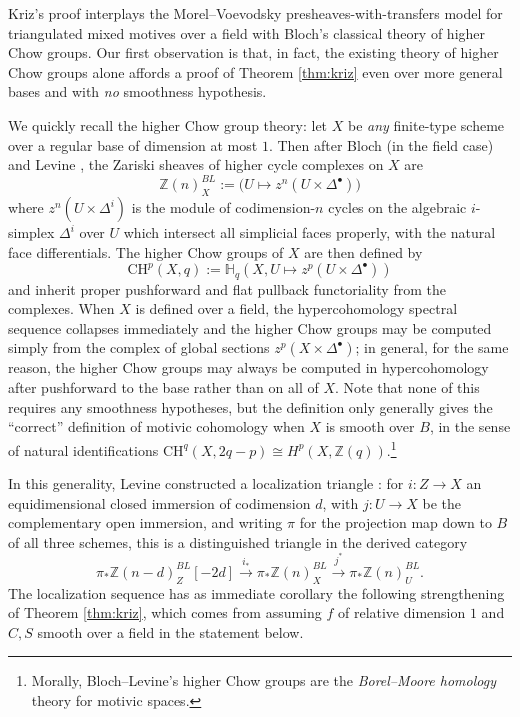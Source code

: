 \documentclass[a4paper,reqno,11pt]{amsart}
\theoremstyle{plain}
\theoremstyle{definition}
\theoremstyle{remark}
\newcommand{\CH}{{\mathrm{CH}}}
\newcommand{\Z}{\mathbb{Z}}
\begin{document}
Kriz's proof interplays the Morel--Voevodsky presheaves-with-transfers model for triangulated mixed motives over a field with Bloch's classical theory of higher Chow groups. Our first observation is that, in fact, the existing theory of higher Chow groups alone affords a proof of Theorem \ref{thm:kriz} even over more general bases and with \emph{no} smoothness hypothesis.

We quickly recall the higher Chow group theory: let $X$ be \emph{any} finite-type scheme over a regular base of dimension at most $1$. Then after Bloch \cite{B} (in the field case) and Levine \cite{L2}, the Zariski sheaves of higher cycle complexes on $X$ are
\[
    \Z(n)^{BL}_{X} := \bigl(U\mapsto z^n(U\times \Delta^\bullet)\bigr)
\]
where $z^n(U\times \Delta^i)$ is the module of codimension-$n$ cycles on the algebraic $i$-simplex $\Delta^i$ over $U$ which intersect all simplicial faces properly, with the natural face differentials. The higher Chow groups of $X$ are then defined by
\[
\CH^p(X, q) := \mathbb{H}_q(X, U\mapsto z^p(U\times \Delta^\bullet))
\]
and inherit proper pushforward and flat pullback functoriality from the complexes. When $X$ is defined over a field, the hypercohomology spectral sequence collapses immediately and the higher Chow groups may be computed simply from the complex of global sections $z^p(X\times \Delta^\bullet)$; in general, for the same reason, the higher Chow groups may always be computed in hypercohomology after pushforward to the base rather than on all of $X$. Note that none of this requires any smoothness hypotheses, but the definition only generally gives the ``correct'' definition of motivic cohomology when $X$ is smooth over $B$, in the sense of natural identifications $\CH^q(X, 2q-p)\cong H^p(X,\Z(q))$.\footnote{Morally, Bloch--Levine's higher Chow groups are the \emph{Borel--Moore homology} theory for motivic spaces.}

In this generality, Levine constructed a localization triangle \cite[Theorem 1.7]{L2}: for $i:Z\to X$ an equidimensional closed immersion of codimension $d$, with $j:U\to X$ be the complementary open immersion, and writing $\pi$ for the projection map down to $B$ of all three schemes, this is a distinguished triangle in the derived category
\[
\pi_*\Z(n-d)^{BL}_Z[-2d] \xrightarrow{i_*} \pi_*\Z(n)_X^{BL} \xrightarrow{j^*} \pi_*\Z(n)_U^{BL}.
\]
The localization sequence has as immediate corollary the following strengthening of Theorem \ref{thm:kriz}, which comes from assuming $f$ of relative dimension $1$ and $C,S$ smooth over a field in the statement below.
\end{document}

